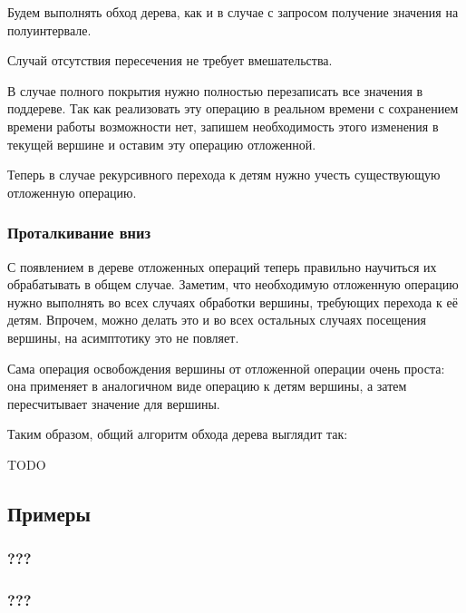\documentclass[a4paper,12pt]{article}
\begin{document}
      Будем выполнять обход дерева, как и в случае с запросом
      получение значения на полуинтервале.

      Случай отсутствия пересечения не требует вмешательства.

      В случае полного покрытия нужно полностью перезаписать все
      значения в поддереве. Так как реализовать эту операцию
      в реальном времени с сохранением времени работы возможности
      нет, запишем необходимость этого изменения в текущей вершине
      и оставим эту операцию отложенной.

      Теперь в случае рекурсивного перехода к детям нужно учесть
      существующую отложенную операцию.

      \subsubsection{Проталкивание вниз}

      С появлением в дереве отложенных операций теперь правильно
      научиться их обрабатывать в общем случае. Заметим, что
      необходимую отложенную операцию нужно выполнять во всех
      случаях обработки вершины, требующих перехода к её детям.
      Впрочем, можно делать это и во всех остальных случаях
      посещения вершины, на асимптотику это не повляет.

      Сама операция освобождения вершины от отложенной операции
      очень проста: она применяет в аналогичном виде операцию
      к детям вершины, а затем пересчитывает значение для вершины.

      Таким образом, общий алгоритм обхода дерева выглядит так:

      TODO

    \subsection{Примеры}
      \subsubsection{???}
      \subsubsection{???}
\end{document}
